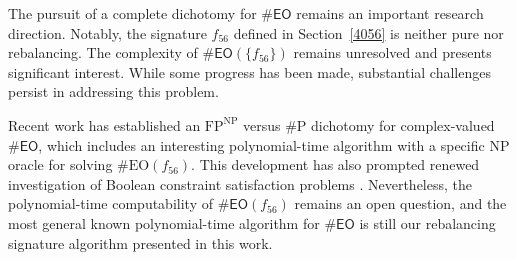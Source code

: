 \documentclass[a4paper,UKenglish,cleveref, autoref, thm-restate]{lipics-v2021}
\newcommand{\eo}[0]{\textsf{EO}}
\begin{document}
The pursuit of a complete dichotomy for $\#\eo$ remains an important research direction. Notably, the signature $f_{56}$ defined in Section~\ref{4056} is neither pure nor rebalancing. The complexity of $\#\eo(\{f_{56}\})$ remains unresolved and presents significant interest. While some progress has been made, substantial challenges persist in addressing this problem.

Recent work \cite{meng2025fpnp} has established an $\text{FP}^\text{NP}$ versus \#P dichotomy for complex-valued $\#\eo$, which includes an interesting polynomial-time algorithm with a specific NP oracle for solving $\#\mathrm{EO}(f_{56})$. This development has also prompted renewed investigation of Boolean constraint satisfaction problems \cite{feder2006classification}. Nevertheless, the polynomial-time computability of $\#\eo(f_{56})$ remains an open question, and the most general known polynomial-time algorithm for $\#\eo$ is still our rebalancing signature algorithm presented in this work.








\appendix
\end{document}
